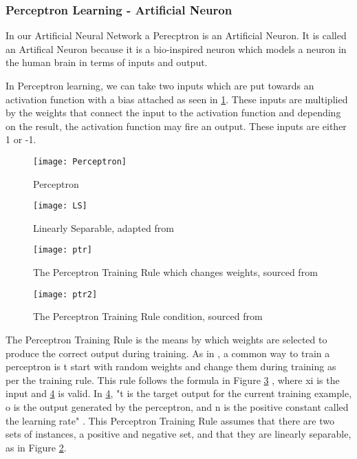 \subsubsection*{Perceptron Learning - Artificial Neuron}
In our Artificial Neural Network a Perecptron is an Artificial Neuron.
It is called an Artifical Neuron because it is a bio-inspired neuron which models
a neuron in the human brain in terms of inputs and output.

In Perceptron learning, we can take two inputs which are put towards an
activation function with a bias attached as seen in \ref{fig:perceptron}.
These inputs are multiplied by the weights that connect the input to the
activation function and depending on the result, the activation function may
fire an output. These inputs are either 1 or -1.

\begin{figure}
     \texttt{[image: Perceptron]}
     \caption{Perceptron}
     \label{fig:perceptron}
\end{figure}

\begin{figure}
    \texttt{[image: LS]}
     \caption{Linearly Separable, adapted from \textcite{MLANN}}
     \label{fig:ls}
\end{figure}

\begin{figure}
    \texttt{[image: ptr]}
     \caption{The Perceptron Training Rule which changes weights, sourced from \textcite{MLANN}}
     \label{fig:ptr}
\end{figure}

\begin{figure}
    \texttt{[image: ptr2]}
     \caption{The Perceptron Training Rule condition, sourced from \textcite{MLANN}}
     \label{fig:ptr2}
\end{figure}

The Perceptron Training Rule is the means by which weights are selected to produce the correct output during training. As in \textcite{MLANN}, a common way to train a perceptron is t start with random weights and change them during training as per the training rule. This rule follows the formula in Figure \ref{fig:ptr} , where xi is the input and \ref{fig:ptr2} is valid. In \ref{fig:ptr2}, "t is the target output for the current training example, o is the output generated by the perceptron, and n is the positive constant called the learning rate" \textcite{MLANN}.
This Perceptron Training Rule assumes that there are two sets of instances, a
positive and negative set, and that they are linearly separable, as in Figure \ref{fig:ls}.


